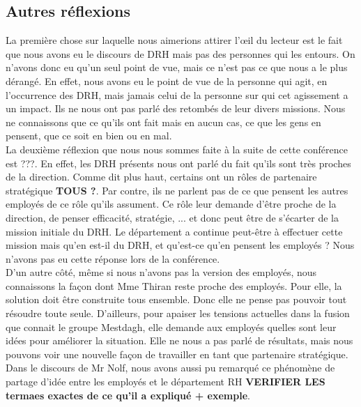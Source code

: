 \subsection{Autres réflexions}

La première chose sur laquelle nous aimerions attirer l'œil du lecteur est le fait que nous avons eu le discours de DRH mais pas des personnes qui les entours. On n'avons donc eu qu'un seul point de vue, mais ce n'est pas ce que nous a le plus dérangé. En effet, nous avons eu le point de vue de la personne qui agit, en l'occurrence des DRH, mais jamais celui de la personne sur qui cet agissement a un impact. Ils ne nous ont pas parlé des retombés de leur divers missions. Nous ne connaissons que ce qu'ils ont fait mais en aucun cas, ce que les gens en pensent, que ce soit en bien ou en mal. \\ 

La deuxième réflexion que nous nous sommes faite à la suite de cette conférence est ???. En effet, les DRH présents nous ont parlé du fait qu'ils sont très proches de la direction. Comme dit plus haut, certains ont un rôles de partenaire stratégique \textbf{TOUS ?}. Par contre, ils ne parlent pas de ce que pensent les autres employés de ce rôle qu'ils assument. Ce rôle leur demande d'être proche de la direction, de penser efficacité, stratégie, ... et donc peut être de s'écarter de la mission initiale du DRH. Le département a continue peut-être à effectuer cette mission mais qu'en est-il du DRH, et qu'est-ce qu'en pensent les employés ? Nous n'avons pas eu cette réponse lors de la conférence. \\

D'un autre côté, même si nous n'avons pas la version des employés, nous connaissons la façon dont Mme Thiran reste proche des employés. Pour elle, la solution doit être construite tous ensemble. Donc elle ne pense pas pouvoir tout résoudre toute seule. D'ailleurs, pour apaiser les tensions actuelles dans la fusion que connait le groupe Mestdagh, elle demande aux employés quelles sont leur idées pour améliorer la situation. Elle ne nous a pas parlé de résultats, mais nous pouvons voir une nouvelle façon de travailler en tant que partenaire stratégique. \\

Dans le discours de Mr Nolf, nous avons aussi pu remarqué ce phénomène de partage d'idée entre les employés et le département RH \textbf{VERIFIER LES termaes exactes de ce qu'il a expliqué + exemple}. \\

